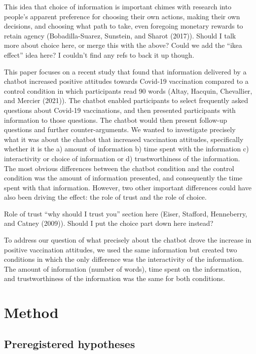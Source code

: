 \documentclass[
  english,
  ,jou,floatsintext]{apa6}
\begin{document}
This idea that choice of information is important chimes with research into people's apparent preference for choosing their own actions, making their own decisions, and choosing what path to take, even foregoing monetary rewards to retain agency (Bobadilla-Suarez, Sunstein, and Sharot (2017)). Should I talk more about choice here, or merge this with the above? Could we add the ``ikea effect'' idea here? I couldn't find any refs to back it up though.

This paper focuses on a recent study that found that information delivered by a chatbot increased positive attitudes towards Covid-19 vaccination compared to a control condition in which participants read 90 words (Altay, Hacquin, Chevallier, and Mercier (2021)). The chatbot enabled participants to select frequently asked questions about Covid-19 vaccinations, and then presented participants with information to those questions. The chatbot would then present follow-up questions and further counter-arguments. We wanted to investigate precisely what it was about the chatbot that increased vaccination attitudes, specifically whether it is the a) amount of information b) time spent with the information c) interactivity or choice of information or d) trustworthiness of the information. The most obvious differences between the chatbot condition and the control condition was the amount of information presented, and consequently the time spent with that information. However, two other important differences could have also been driving the effect: the role of trust and the role of choice.

Role of trust ``why should I trust you'' section here (Eiser, Stafford, Henneberry, and Catney (2009)). Should I put the choice part down here instead?

To address our question of what precisely about the chatbot drove the increase in positive vaccination attitudes, we used the same information but created two conditions in which the only difference was the interactivity of the information. The amount of information (number of words), time spent on the information, and trustworthiness of the information was the same for both conditions.

\hypertarget{method}{%
\section{Method}\label{method}}

\hypertarget{preregistered-hypotheses}{%
\subsection{Preregistered hypotheses}\label{preregistered-hypotheses}}
\end{document}
